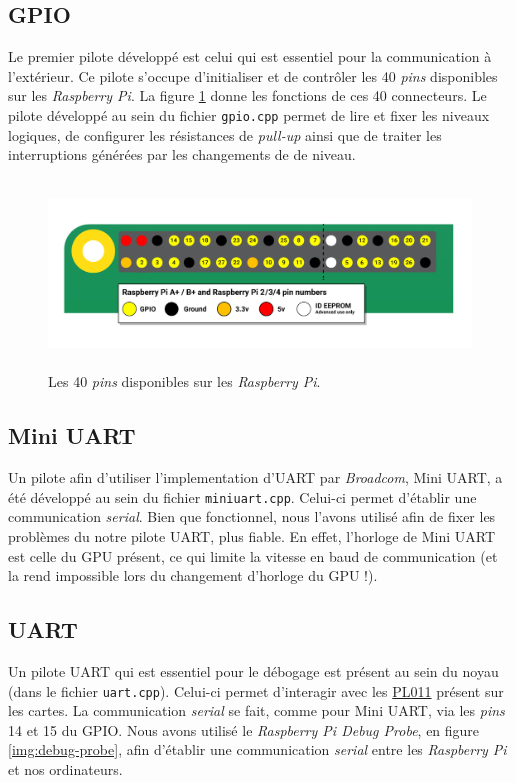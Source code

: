 \documentclass[french, 12pt]{article}
\newcommand{\rpi}{\emph{Raspberry Pi}}
\begin{document}
\subsection{GPIO}
Le premier pilote développé est celui qui est essentiel pour la communication
à l'extérieur. Ce pilote s'occupe d'initialiser et de contrôler les 40
\textit{pins} disponibles sur les \rpi{}. La figure \ref{img:gpio} donne les
fonctions de ces 40 connecteurs. Le pilote développé au sein du fichier
\texttt{gpio.cpp} permet de lire et fixer les niveaux logiques, de configurer
les résistances de \textit{pull-up} ainsi que de traiter les interruptions
générées par les changements de de niveau.

\begin{figure}[htp]
    \begin{center}
        \includegraphics[height=5cm]{gpio.png}
    \end{center}
    \caption{Les 40 \textit{pins} disponibles sur les \rpi{}.}
    \label{img:gpio}
\end{figure}

\subsection{Mini UART}
Un pilote afin d'utiliser l'implementation d'UART par \emph{Broadcom},
Mini UART, a été développé au sein du fichier \texttt{miniuart.cpp}. Celui-ci
permet d'établir une communication \emph{serial}. Bien que fonctionnel, nous
l'avons utilisé afin de fixer les problèmes du notre pilote UART, plus fiable.
En effet, l'horloge de Mini UART est celle du GPU présent, ce qui limite la
vitesse en baud de communication (et la rend impossible lors du changement
d'horloge du GPU !).

\subsection{UART}
Un pilote UART qui est essentiel pour le débogage est présent au sein du noyau
(dans le fichier \texttt{uart.cpp}). Celui-ci permet d'interagir avec les
\href{https://developer.arm.com/Processors/PL011}{PL011} présent sur les cartes.
La communication \textit{serial} se fait, comme pour Mini UART, via les
\textit{pins} 14 et 15 du GPIO. Nous avons utilisé le
\textit{Raspberry Pi Debug Probe}, en figure \ref{img:debug-probe}, afin
d'établir une communication \textit{serial} entre les \rpi{} et nos ordinateurs.
\end{document}
